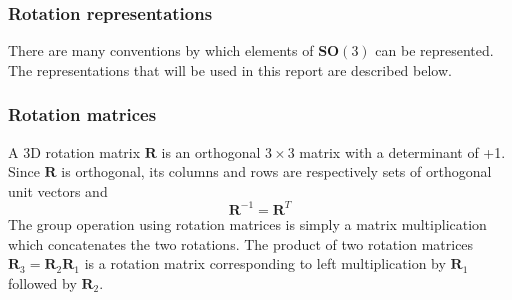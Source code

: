 		\begin{comment}
		\subsubsection{Adjoint map}
		EXPLANATION???? Hard to explain practical application without discussing reference frames: ie if position defined in body fixed frame but some other transformation defined in inertial frame. First undo rotation to get pose in inertial frame, apply transformation, then re-apply rotation.
		\begin{equation}
			\Psi_R: \mathbf{SO}(3) \rightarrow \mathbf{SO}(3) \textnormal{, }
			\Psi_R(A) \stackrel{\Delta}{=} RAR^{-1}
		\end{equation}
		Taking the derivative:
		\begin{equation}
			\frac{\partial}{\partial t} \Psi_R(A(t))|_{t=0} = RBR^{-1} \textnormal{, }
			B \stackrel{\Delta}{=} 	\frac{\partial}{\partial t}A(t)|_{t=0}
		\end{equation}
		The adjoint	representation of $\mathbf{SO}(3)$ is given by the mapping
		\begin{equation}
			\textbf{Adj}_R: \mathfrak{so}(3) \rightarrow \mathfrak{so}(3) \textnormal{, }
			\textbf{Adj}_R(B) \stackrel{\Delta}{=} RBR^{-1}
		\end{equation}
		\end{comment}
		
		\subsubsection{Rotation representations}	
		There are many conventions by which elements of $\mathbf{SO}(3)$ can be represented. The representations that will be used in this report are described below.
		
		\subsubsection{Rotation matrices}\label{sec:rotationmatrix}
		A 3D rotation matrix $\mathbf{R}$ is an orthogonal $3 \times 3$ matrix with a determinant of +1. Since $\mathbf{R}$ is orthogonal, its columns and rows are respectively sets of orthogonal unit vectors and
		\begin{equation}
			\mathbf{R}^{-1} = \mathbf{R}^{T}
		\end{equation}		
		The group operation using rotation matrices is simply a matrix multiplication which concatenates the two rotations. The product of two rotation matrices $\mathbf{R}_3 = \mathbf{R}_2\mathbf{R}_1$ is a rotation matrix corresponding to left multiplication by $\mathbf{R}_1$ followed by $\mathbf{R}_2$.
		
